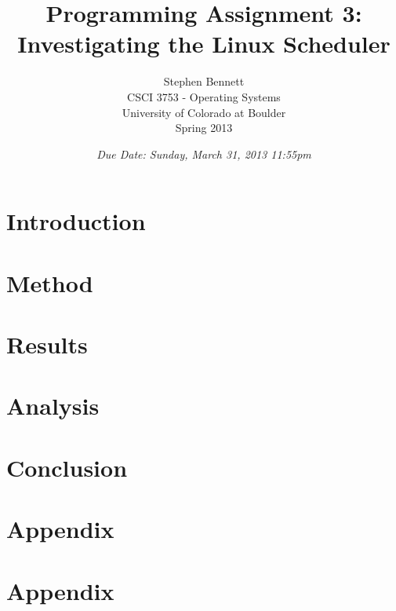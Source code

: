 \documentclass[12pt]{article}
\title{Programming Assignment 3:\\Investigating the Linux Scheduler}
\author{
  Stephen Bennett\\
  CSCI 3753 - Operating Systems\\
  University of Colorado at Boulder\\
  Spring 2013\\
}
\date{\emph{Due Date: Sunday, March 31, 2013 11:55pm}}
\begin{document}
\maketitle

\clearpage
\vspace*{\fill}
\begin{abstract}
    
\end{abstract}
\vspace*{\fill}

\clearpage
\section{Introduction}


\section{Method}


\section{Results}


\section{Analysis}


\section{Conclusion}


\clearpage
\begin{thebibliography}{9}      %

\end{thebibliography}

\appendix

\clearpage
\section{Appendix}


\clearpage
\section{Appendix}

\end{document}
